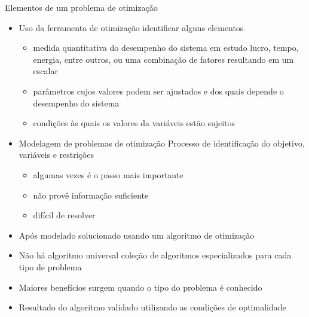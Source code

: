 \begin{frame}{Elementos de um problema de otimização}
  \begin{itemize}
    \item Uso da ferramenta de otimização  identificar alguns elementos
    \begin{itemize}
      \item {}  medida quantitativa do desempenho do sistema em estudo  lucro, tempo, energia, entre outros, ou uma combinação de fatores resultando em um escalar
      \item {}  parâmetros cujos valores podem ser ajustados e dos quais depende o desempenho do sistema 
      \item {}  condições às quais os valores da variáveis estão sujeitos
    \end{itemize}
    
    \item Modelagem de problemas de otimização  Processo de identificação do objetivo, variáveis e restrições
    \begin{itemize}
      \item {}  \alert{algumas vezes é o passo mais importante}
      \item {}  não provê informação suficiente
      \item {}  difícil de resolver
    \end{itemize}

    \item Após modelado  solucionado usando um algoritmo de otimização

    \item Não há algoritmo universal  coleção de algoritmos especializados para cada tipo de problema

    \item<alert@1> Maiores benefícios  surgem quando o tipo do problema é conhecido

    \item Resultado do algoritmo  validado utilizando as condições de optimalidade
  \end{itemize}
\end{frame}

